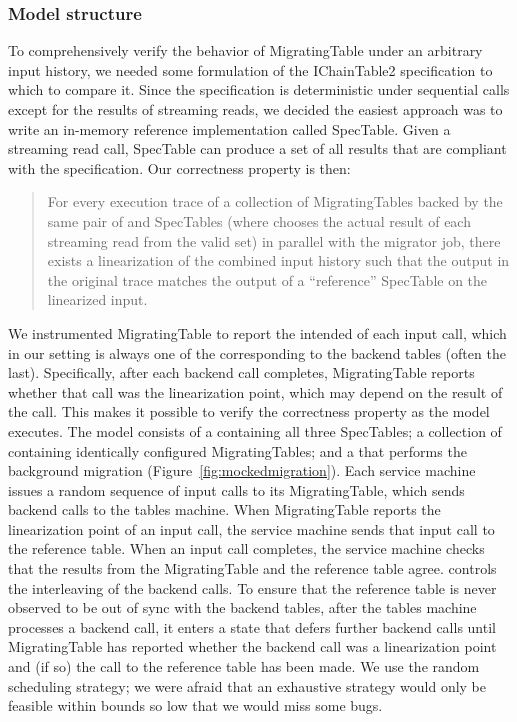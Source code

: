 \subsubsection{Model structure}

To comprehensively verify the behavior of MigratingTable under an arbitrary input history, we needed some formulation of the IChainTable2 specification to which to compare it.  Since the specification is deterministic under sequential calls except for the results of streaming reads, we decided the easiest approach was to write an in-memory reference implementation called SpecTable.  Given a streaming read call, SpecTable can produce a set of all results that are compliant with the specification.  Our correctness property is then:
\begin{quote}
For every execution trace of a collection of MigratingTables backed by the same pair of  and  SpecTables (where \psharp chooses the actual result of each streaming read from the valid set) in parallel with the migrator job, there exists a linearization of the combined input history such that the output in the original trace matches the output of a ``reference'' SpecTable on the linearized input.
\end{quote}
%
We instrumented MigratingTable to report the intended  of each input call, which in our setting is always one of the corresponding  to the backend tables (often the last).  Specifically, after each backend call completes, MigratingTable reports whether that call was the linearization point, which may depend on the result of the call.  This makes it possible to verify the correctness property as the model executes.  The model consists of a \psharp {} containing all three SpecTables; a collection of  containing identically configured MigratingTables; and a  that performs the background migration (Figure~\ref{fig:mockedmigration}).  Each service machine issues a random sequence of input calls to its MigratingTable, which sends backend calls to the tables machine.  When MigratingTable reports the linearization point of an input call, the service machine sends that input call to the reference table.  When an input call completes, the service machine checks that the results from the MigratingTable and the reference table agree.  \psharp controls the interleaving of the backend calls.  To ensure that the reference table is never observed to be out of sync with the backend tables, after the tables machine processes a backend call, it enters a state that defers further backend calls until MigratingTable has reported whether the backend call was a linearization point and (if so) the call to the reference table has been made.  We use the \psharp random scheduling strategy; we were afraid that an exhaustive strategy would only be feasible within bounds so low that we would miss some bugs.

